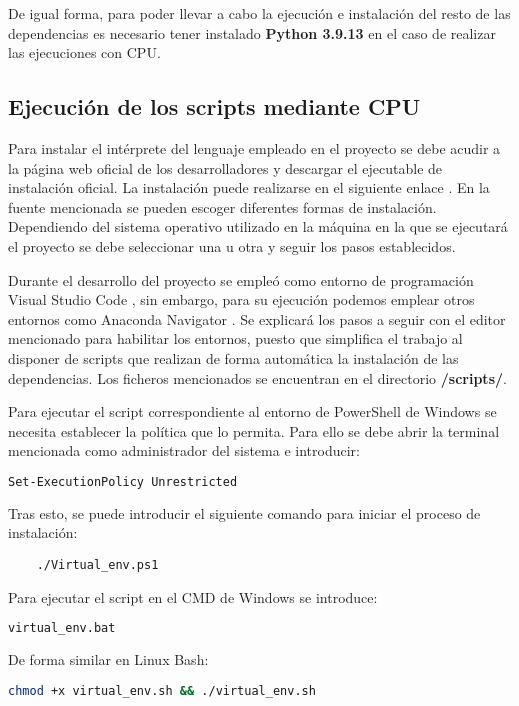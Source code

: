 De igual forma, para poder llevar a cabo la ejecución e instalación del resto de las dependencias es necesario tener instalado \textbf{Python 3.9.13} en el
caso de realizar las ejecuciones con CPU.

\subsection{Ejecución de los scripts mediante CPU}
Para instalar el intérprete del lenguaje empleado en el proyecto se debe acudir a la página web oficial de los desarrolladores y descargar el ejecutable de instalación oficial.
La instalación puede realizarse en el siguiente enlace \cite{misc:python2023}.
En la fuente mencionada se pueden escoger diferentes formas de instalación. Dependiendo del sistema operativo utilizado en la máquina en la que se ejecutará el proyecto se debe seleccionar una
u otra y seguir los pasos establecidos.

Durante el desarrollo del proyecto se empleó como entorno de programación Visual Studio Code \cite{misc:code2023}, sin embargo, para su ejecución podemos emplear otros entornos como 
Anaconda Navigator \cite{misc:conda2023}.
Se explicará los pasos a seguir con el editor mencionado para habilitar los entornos, puesto que simplifica el trabajo al disponer de scripts que realizan de forma automática 
la instalación de las dependencias.
Los ficheros mencionados se encuentran en el directorio \textbf{/scripts/}.

Para ejecutar el script correspondiente al entorno de PowerShell de Windows se necesita establecer la política que lo permita. Para ello se debe abrir la terminal mencionada
como administrador del sistema e introducir: 
\begin{lstlisting}[language=Bash]
    Set-ExecutionPolicy Unrestricted    
\end{lstlisting}

Tras esto, se puede introducir el siguiente comando para iniciar el proceso de instalación: 
\begin{lstlisting}
    ./Virtual_env.ps1
\end{lstlisting}

Para ejecutar el script en el CMD de Windows se introduce:
\begin{lstlisting}[language=Bash]
    virtual_env.bat
\end{lstlisting}

De forma similar en Linux Bash:
\begin{lstlisting}[language=Bash]
    chmod +x virtual_env.sh && ./virtual_env.sh    
\end{lstlisting}

